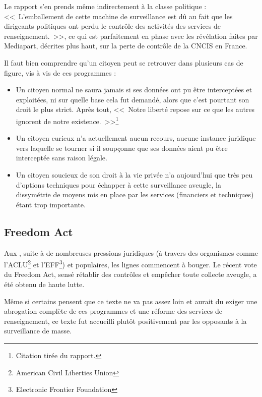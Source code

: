 Le rapport s'en prends même indirectement à la classe politique :
<<~L'emballement de cette machine de surveillance est dû au fait que les
dirigeants politiques ont perdu le contrôle des activités des services de
renseignement.~>>, ce qui est parfaitement en phase avec les révélation faites
par Mediapart, décrites plus haut, sur la perte de contrôle de la CNCIS en
France.

Il faut bien comprendre qu'un citoyen peut se retrouver dans
plusieurs cas de figure, vis à vis de ces programmes :

\begin{itemize}
  \item Un citoyen normal ne saura jamais si ses données ont pu être
  interceptées et exploitées, ni sur quelle base cela fut demandé, alors que
  c'est pourtant son droit le plus strict. Après tout, <<~Notre liberté repose
  sur ce que les autres ignorent de notre existence.~>>\footnote{Citation tirée
  du rapport.}
  \item Un citoyen curieux n'a actuellement aucun recours, aucune instance
  juridique vers laquelle se tourner si il soupçonne que ses données aient pu
  être interceptée sans raison légale.
  \item Un citoyen soucieux de son droit à la vie privée n'a aujourd'hui que
  très peu d'options techniques pour échapper à cette surveillance aveugle, la
  dissymétrie de moyens mis en place par les services (financiers et techniques)
  étant trop importante.
\end{itemize}

\subsection{Freedom Act}

Aux \EUA, suite à de nombreuses pressions juridiques (à travers des
organismes comme l'ACLU\footnote{American Civil Liberties Union} et
l'EFF\footnote{Electronic Frontier Foundation}) et populaires, les lignes
commencent à bouger. Le récent vote du Freedom Act, sensé rétablir des contrôles
et empêcher toute collecte aveugle, a été obtenu de haute
lutte\cite{freedom}.

Même si certains pensent que ce texte ne va pas assez loin et
aurait du exiger une abrogation complète de ces programmes et une réforme des services de
renseignement, ce texte fut accueilli plutôt positivement par les opposants à la
surveillance de masse.


